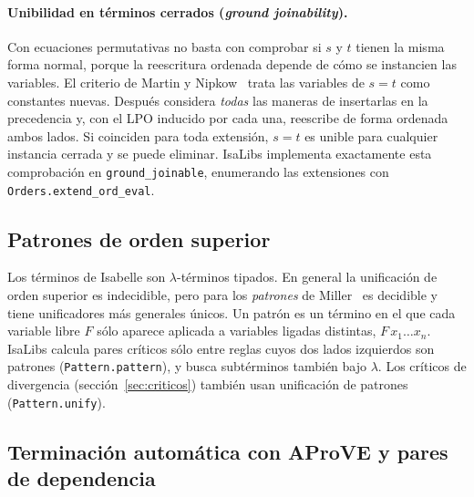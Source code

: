 \documentclass[11pt,a4paper]{article}
\newcommand{\isa}[1]{\texttt{#1}}
\theoremstyle{definition}
\theoremstyle{remark}
\begin{document}
\paragraph{Unibilidad en términos cerrados (\emph{ground joinability}).}
Con ecuaciones permutativas no basta con comprobar si $s$ y $t$ tienen la misma forma
normal, porque la reescritura ordenada depende de cómo se instancien las variables.
El criterio de Martin y Nipkow~\cite{martin-nipkow} trata las variables de $s = t$
como constantes nuevas. Después considera \emph{todas} las maneras de insertarlas
en la precedencia y, con el LPO inducido por cada una, reescribe de forma ordenada
ambos lados. Si coinciden para toda extensión, $s = t$ es unible para cualquier
instancia cerrada y se puede eliminar. IsaLibs implementa exactamente esta
comprobación en \isa{ground\_joinable}, enumerando las extensiones con
\isa{Orders.extend\_ord\_eval}.

\subsection{Patrones de orden superior}

Los términos de Isabelle son $\lambda$-términos tipados. En general la unificación
de orden superior es indecidible, pero para los \emph{patrones} de Miller~\cite{miller}
es decidible y tiene unificadores más generales únicos. Un patrón es un término en el
que cada variable libre $F$ sólo aparece aplicada a variables ligadas distintas,
$F\,x_1 \ldots x_n$. IsaLibs calcula pares críticos sólo entre reglas cuyos dos lados
izquierdos son patrones (\isa{Pattern.pattern}), y busca subtérminos también bajo
$\lambda$. Los críticos de divergencia (sección~\ref{sec:criticos}) también usan
unificación de patrones (\isa{Pattern.unify}).

\subsection{Terminación automática con AProVE y pares de dependencia}
\label{sec:aprove}
\end{document}
